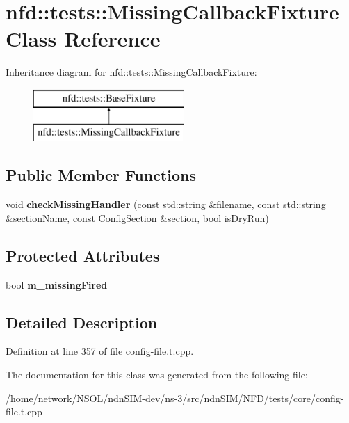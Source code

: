 \hypertarget{classnfd_1_1tests_1_1MissingCallbackFixture}{}\section{nfd\+:\+:tests\+:\+:Missing\+Callback\+Fixture Class Reference}
\label{classnfd_1_1tests_1_1MissingCallbackFixture}
Inheritance diagram for nfd\+:\+:tests\+:\+:Missing\+Callback\+Fixture\+:\begin{figure}[H]
\begin{center}
\leavevmode
\includegraphics[height=2.000000cm]{classnfd_1_1tests_1_1MissingCallbackFixture}
\end{center}
\end{figure}
\subsection*{Public Member Functions}
\begin{DoxyCompactItemize}
\item 
void {\bfseries check\+Missing\+Handler} (const std\+::string \&filename, const std\+::string \&section\+Name, const Config\+Section \&section, bool is\+Dry\+Run)\hypertarget{classnfd_1_1tests_1_1MissingCallbackFixture_a74bb7daae57248d68f83091794e38652}{}\label{classnfd_1_1tests_1_1MissingCallbackFixture_a74bb7daae57248d68f83091794e38652}

\end{DoxyCompactItemize}
\subsection*{Protected Attributes}
\begin{DoxyCompactItemize}
\item 
bool {\bfseries m\+\_\+missing\+Fired}\hypertarget{classnfd_1_1tests_1_1MissingCallbackFixture_aa3f0a7baa90ff872f132b92ce46ab818}{}\label{classnfd_1_1tests_1_1MissingCallbackFixture_aa3f0a7baa90ff872f132b92ce46ab818}

\end{DoxyCompactItemize}


\subsection{Detailed Description}


Definition at line 357 of file config-\/file.\+t.\+cpp.



The documentation for this class was generated from the following file\+:\begin{DoxyCompactItemize}
\item 
/home/network/\+N\+S\+O\+L/ndn\+S\+I\+M-\/dev/ns-\/3/src/ndn\+S\+I\+M/\+N\+F\+D/tests/core/config-\/file.\+t.\+cpp\end{DoxyCompactItemize}
